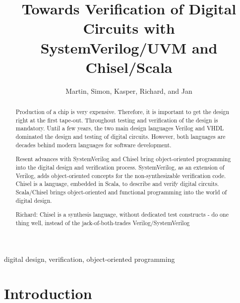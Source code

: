 \documentclass[a4paper, conference]{IEEEtran}
\newcommand{\ducky}[1]{{\color{orange} Richard: #1}}
\begin{document}
\title{Towards Verification of Digital Circuits with\\
SystemVerilog/UVM and Chisel/Scala}

\author{Martin, Simon, Kasper, Richard, and Jan}




\maketitle \thispagestyle{empty}

\begin{abstract}
Production of a chip is very expensive. Therefore, it is important to get the design right
at the first tape-out. Throughout testing and verification of the design is mandatory.
Until a few years, the two main design languages Verilog and VHDL dominated the
design and testing of digital circuits. However, both languages are decades behind
modern languages for software development.

Resent advances with SystemVerilog and Chisel bring object-oriented programming
into the digital design and verification process. SystemVerilog, as an extension of Verilog,
adds object-oriented concepts for the non-synthesizable verification code.
Chisel is a language, embedded in Scala, to describe and verify digital circuits.
Scala/Chisel brings object-oriented and functional programming into the world of
digital design.

\ducky{Chisel is a synthesis language, without dedicated test constructs - do one thing well, instead of the jack-of-both-trades Verilog/SystemVerilog}
\end{abstract}

\begin{IEEEkeywords}
digital design, verification, object-oriented programming
\end{IEEEkeywords}


\section{Introduction}
\label{sec:intro}
\end{document}
